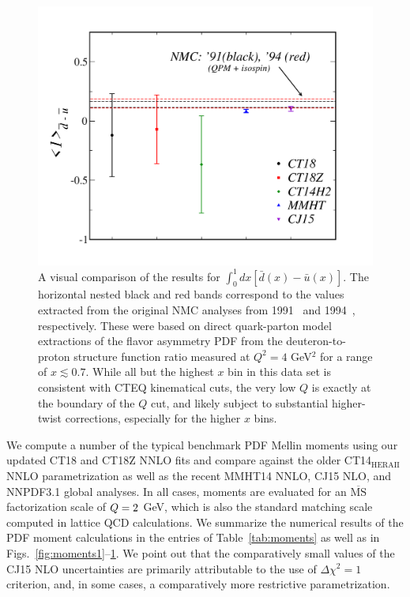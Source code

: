 %
\begin{figure}
\includegraphics[scale=0.45]{./fig/Gott-comps_v3.pdf}
%
	\vspace{-1.1cm}
\caption{
	A visual comparison of the results for $\int_0^1 dx [\bar{d}(x)-\bar{u}(x)]$. The horizontal
	nested black and red bands correspond to the values extracted from the original NMC analyses from 1991~\cite{Amaudruz:1991at} and 1994~\cite{Arneodo:1994sh}, respectively. These were based on direct
	quark-parton model extractions of the flavor asymmetry PDF from the deuteron-to-proton
	structure function ratio measured at $Q^2 = 4$ GeV$^2$ for a range of $x \lesssim 0.7$. While
	all but the highest $x$ bin in this data set is consistent with CTEQ kinematical cuts,
	the very low $Q$ is exactly at the boundary of the $Q$ cut,
        and likely subject to substantial higher-twist corrections, especially for the higher $x$ bins.
}
\label{fig:moments2}
\end{figure}
%

%
We compute a number of the typical benchmark PDF Mellin moments using our updated CT18 and CT18Z NNLO fits and compare against
the older CT14$_\mathrm{HERAII}$ NNLO parametrization as well as the recent MMHT14 NNLO, CJ15 NLO, and NNPDF3.1 global analyses.
In all cases, moments are evaluated for an $\overline{\mathrm{MS}}$ factorization scale of $Q = 2$ GeV, which is also the
standard matching scale computed in lattice QCD calculations. We summarize the numerical results of the PDF moment calculations
in the entries of Table~\ref{tab:moments} as well as in Figs.~\ref{fig:moments1}--\ref{fig:moments2}.
%
We point out that the comparatively small values of the CJ15 NLO uncertainties are primarily attributable to the use of
$\Delta \chi^2 = 1$ criterion, and, in some cases, a comparatively more restrictive parametrization.

